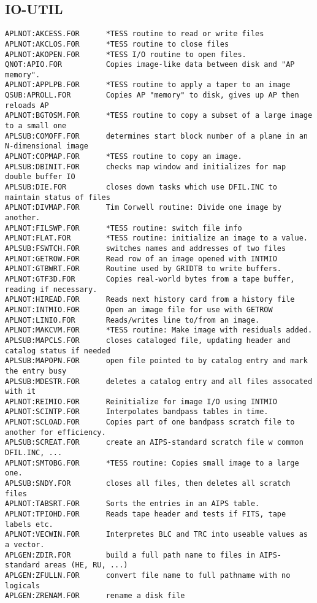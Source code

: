 \subsection{IO-UTIL}
\begin{verbatim}
APLNOT:AKCESS.FOR      *TESS routine to read or write files
APLNOT:AKCLOS.FOR      *TESS routine to close files
APLNOT:AKOPEN.FOR      *TESS I/O routine to open files.
QNOT:APIO.FOR          Copies image-like data between disk and "AP memory".
APLNOT:APPLPB.FOR      *TESS routine to apply a taper to an image
QSUB:APROLL.FOR        Copies AP "memory" to disk, gives up AP then reloads AP
APLNOT:BGTOSM.FOR      *TESS routine to copy a subset of a large image to a small one
APLSUB:COMOFF.FOR      determines start block number of a plane in an N-dimensional image
APLNOT:COPMAP.FOR      *TESS routine to copy an image.
APLSUB:DBINIT.FOR      checks map window and initializes for map double buffer IO
APLSUB:DIE.FOR         closes down tasks which use DFIL.INC to maintain status of files
APLNOT:DIVMAP.FOR      Tim Corwell routine: Divide one image by another.
APLNOT:FILSWP.FOR      *TESS routine: switch file info
APLNOT:FLAT.FOR        *TESS routine: initialize an image to a value.
APLSUB:FSWTCH.FOR      switches names and addresses of two files
APLNOT:GETROW.FOR      Read row of an image opened with INTMIO
APLNOT:GTBWRT.FOR      Routine used by GRIDTB to write buffers.
APLNOT:GTF3D.FOR       Copies real-world bytes from a tape buffer, reading if necessary.
APLNOT:HIREAD.FOR      Reads next history card from a history file
APLNOT:INTMIO.FOR      Open an image file for use with GETROW
APLNOT:LINIO.FOR       Reads/writes line to/from an image.
APLNOT:MAKCVM.FOR      *TESS routine: Make image with residuals added.
APLSUB:MAPCLS.FOR      closes cataloged file, updating header and catalog status if needed
APLSUB:MAPOPN.FOR      open file pointed to by catalog entry and mark the entry busy
APLSUB:MDESTR.FOR      deletes a catalog entry and all files assocated with it
APLNOT:REIMIO.FOR      Reinitialize for image I/O using INTMIO
APLNOT:SCINTP.FOR      Interpolates bandpass tables in time.
APLNOT:SCLOAD.FOR      Copies part of one bandpass scratch file to another for efficiency.
APLSUB:SCREAT.FOR      create an AIPS-standard scratch file w common DFIL.INC, ...
APLNOT:SMTOBG.FOR      *TESS routine: Copies small image to a large one.
APLSUB:SNDY.FOR        closes all files, then deletes all scratch files
APLNOT:TABSRT.FOR      Sorts the entries in an AIPS table.
APLNOT:TPIOHD.FOR      Reads tape header and tests if FITS, tape labels etc.
APLNOT:VECWIN.FOR      Interpretes BLC and TRC into useable values as a vector.
APLGEN:ZDIR.FOR        build a full path name to files in AIPS-standard areas (HE, RU, ...)
APLGEN:ZFULLN.FOR      convert file name to full pathname with no logicals
APLGEN:ZRENAM.FOR      rename a disk file
\end{verbatim}
 

